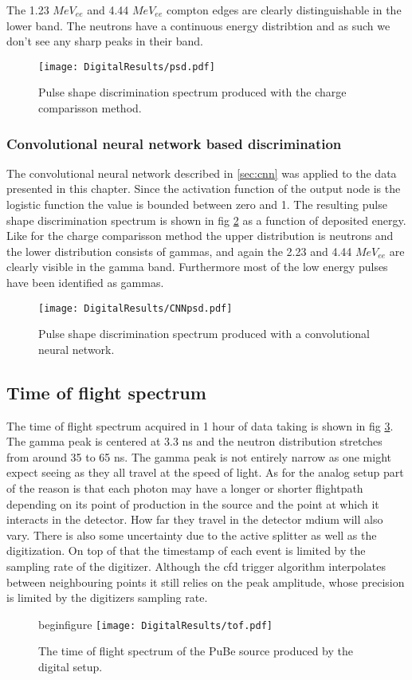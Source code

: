 \documentclass[main.tex]{subfiles}
\begin{document}
The 1.23 $MeV_{ee}$ and 4.44 $MeV_{ee}$ compton edges are clearly distinguishable in the lower band. The neutrons have a continuous energy distribtion and as such we don't see any sharp peaks in their band. 

\begin{figure}[ht]
    \centering
        \texttt{[image: DigitalResults/psd.pdf]}
        \caption{Pulse shape discrimination spectrum produced with the charge comparisson method.}
        \label{fig:psd_d}
\end{figure}

\subsubsection{Convolutional neural network based discrimination}
The convolutional neural network described in \ref{sec:cnn} was applied to the data presented in this chapter. Since the activation function of the output node is the logistic function the value is bounded between zero and 1. The resulting pulse shape discrimination spectrum is shown in fig \ref{fig:cnn_E} as a function of deposited energy. Like for the charge comparisson method the upper distribution is neutrons and the lower distribution consists of gammas, and again the 2.23 and 4.44 $MeV_{ee}$ are clearly visible in the gamma band. Furthermore most of the low energy pulses have been identified as gammas.


\begin{figure}[ht]
    \centering
        \texttt{[image: DigitalResults/CNNpsd.pdf]}
        \caption{Pulse shape discrimination spectrum produced with a convolutional neural network.}
    \label{fig:cnn_E} 
\end{figure}

\clearpage
\subsection{Time of flight spectrum}
The time of flight spectrum acquired in 1 hour of data taking is shown in fig \ref{fig:D_TOF}. The gamma peak is centered at 3.3 ns and the neutron distribution stretches from around 35 to 65 ns. The gamma peak is not entirely narrow as one might expect seeing as they all travel at the speed of light. As for the analog setup part of the reason is that each photon may have a longer or shorter flightpath depending on its point of production in the source and the point at which it interacts in the detector. How far they travel in the detector mdium will also vary. There is also some uncertainty due to the active splitter as well as the digitization. On top of that the timestamp of each event is limited by the sampling rate of the digitizer. Although the cfd trigger algorithm interpolates between neighbouring points it still relies on the peak amplitude, whose precision is limited by the digitizers sampling rate.
\begin{figure}[ht]
begin{figure}
    \centering
        \texttt{[image: DigitalResults/tof.pdf]}
        \caption{The time of flight spectrum of the PuBe source produced by the digital setup.}
    \label{fig:D_TOF} 
\end{figure}
\end{document}
